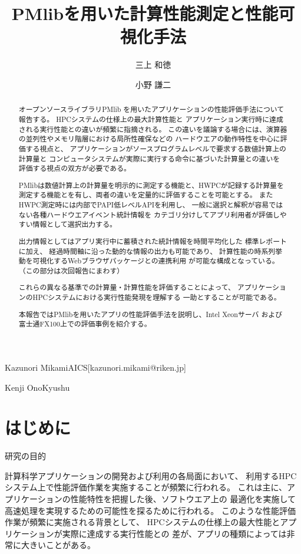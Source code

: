 \documentclass[submit,techrep,noauthor]{ipsj}
\begin{document}
\title{PMlibを用いた計算性能測定と性能可視化手法}


\author{三上 和徳}{Kazunori Mikami}{AICS}[kazunori.mikami@riken.jp]
\author{小野 謙二}{Kenji Ono}{Kyushu}

\begin{abstract}
オープンソースライブラリPMlib
を用いたアプリケーションの性能評価手法について報告する。
HPCシステムの仕様上の最大計算性能と
アプリケーション実行時に達成される実行性能との違いが頻繁に指摘される。
この違いを議論する場合には、演算器の並列性やメモリ階層における局所性確保などの
ハードウエアの動作特性を中心に評価する視点と、
アプリケーションがソースプログラムレベルで要求する数値計算上の計算量と
コンピュータシステムが実際に実行する命令に基づいた計算量との違いを
評価する視点の双方が必要である。

PMlibは数値計算上の計算量を明示的に測定する機能と、HWPCが記録する計算量を
測定する機能とを有し、両者の違いを定量的に評価することを可能とする。
またHWPC測定時には内部でPAPI低レベルAPIを利用し、
一般に選択と解釈が容易ではない各種ハードウエアイベント統計情報を
カテゴリ分けしてアプリ利用者が評価しやすい情報として選択出力する。

{ \color{blue}
出力情報としてはアプリ実行中に蓄積された統計情報を時間平均化した
標準レポートに加え、
経過時間軸に沿った動的な情報の出力も可能であり、
計算性能の時系列挙動を可視化するWebブラウザパッケージとの連携利用
が可能な構成となっている。（この部分は次回報告にまわす）
}

これらの異なる基準での計算量・計算性能を評価することによって、
アプリケーションのHPCシステムにおける実行性能発現を理解する
一助とすることが可能である。

本報告ではPMlibを用いたアプリの性能評価手法を説明し、Intel Xeonサーバ
および富士通FX100上での評価事例を紹介する。
\end{abstract}

\maketitle

\section{はじめに}
研究の目的

計算科学アプリケーションの開発および利用の各局面において、
利用するHPCシステム上で性能評価作業を実施することが頻繁に行われる。
これは主に、アプリケーションの性能特性を把握した後、ソフトウエア上の
最適化を実施して高速処理を実現するための可能性を探るために行われる。
このような性能評価作業が頻繁に実施される背景として、
HPCシステムの仕様上の最大性能とアプリケーションが実際に達成する実行性能との
差が、アプリの種類によっては非常に大きいことがある。
\end{document}
